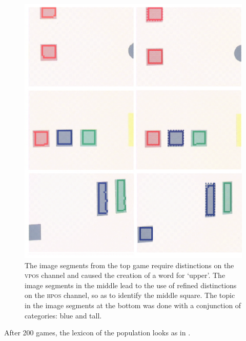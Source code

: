 \begin{figure}
\begin{center}
\includegraphics[width=0.8\columnwidth]{chap7/figs/plate-15-vpos.pdf}
\end{center}
\caption{The image segments from the top game require 
distinctions on the \textsc{vpos} channel and 
caused the creation of a word for `upper'. The image 
segments in the middle lead to the use of refined
distinctions on the \textsc{hpos} channel, so as to 
identify the middle square. The topic in the 
image segments at the bottom was done with a 
conjunction of categories: blue and tall.}
\label{fig:plate-15}
\end{figure}

After 200 games, the lexicon of the population looks as in . 

